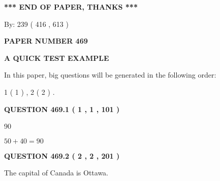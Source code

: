 \documentclass[12pt]{article}
\begin{document}
\vspace{1.0in} 
{\textbf{\large{ *** END OF PAPER, THANKS *** }}} 
   
   
\hspace{1.0in} By: 
 239 ( 416 ,  613 )
   
   
   
   
\newpage 
\setcounter{page}{ 
   469001 } 
   
   
   
   
 {\textbf{ \Large{ PAPER NUMBER  469  }}}
   
   
\vspace{0.2in}
   
   
   
   
   
   
 \vspace{0.2in}
{\LARGE {\textbf{ A QUICK TEST EXAMPLE}}}
   
   
   
\vspace{0.2in}
   
In this paper, big questions will be generated in the following order: 
   
   
   1 ( 1 )
 ,
   2 ( 2 )
 .
  
\vspace{0.2in}
  
{\textbf{\Large{QUESTION
469.1 
 ( 1 , 1 , 101 )
}}}
  
  
 
 
\noindent{}

90
 
 
 
 
\noindent{}

$ %
50 +  %
40=   %
90$
 
 
  
\vspace{0.2in}
  
{\textbf{\Large{QUESTION
469.2 
 ( 2 , 2 , 201 )
}}}
  
  
 
 
\noindent{}
 
 
The capital of Canada is Ottawa.
 
\end{document}
